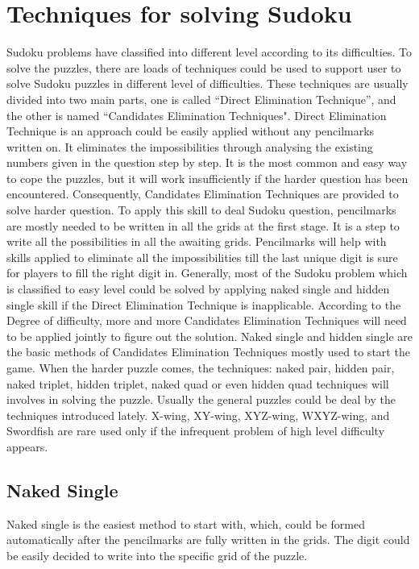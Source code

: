 \documentclass[11pt]{report}
\begin{document}
\chapter{Techniques for solving Sudoku}
\label{sec:Techniques}
Sudoku problems have classified into different level according to its difficulties. To solve the puzzles, there are loads of techniques could be used to support user to solve Sudoku puzzles in different level of difficulties.
These techniques are usually divided into two main parts, one is called “Direct Elimination Technique”, and the other is named “Candidates Elimination Techniques".
Direct Elimination Technique is an approach could be easily applied without any pencilmarks written on. It eliminates the impossibilities through analysing the existing numbers given in the question step by step. It is the most common and easy way to cope the puzzles, but it will work insufficiently if the harder question has been encountered. 
Consequently, Candidates Elimination Techniques are provided to solve harder question. To apply this skill to deal Sudoku question, pencilmarks are mostly needed to be written in all the grids at the first stage. It is a step to write all the possibilities in all the awaiting grids. Pencilmarks will help with skills applied to eliminate all the impossibilities till the last unique digit is sure for players to fill the right digit in.
Generally, most of the Sudoku problem which is classified to easy level could be solved by applying naked single and hidden single skill if the Direct Elimination Technique is inapplicable. According to the Degree of difficulty, more and more Candidates Elimination Techniques will need to be applied jointly to figure out the solution. 
Naked single and hidden single are the basic methods of Candidates Elimination Techniques mostly used to start the game. When the harder puzzle comes, the techniques: naked pair, hidden pair, naked triplet, hidden triplet, naked quad or even hidden quad techniques will involves in solving the puzzle. Usually the general puzzles could be deal by the techniques introduced lately. X-wing, XY-wing, XYZ-wing, WXYZ-wing, and Swordfish are rare used only if the infrequent problem of high level difficulty appears. 

\section{Naked Single}
\label{sec:Naked Single}
Naked single is the easiest method to start with, which, could be formed automatically after the pencilmarks are fully written in the grids. The digit could be easily decided to write into the specific grid of the puzzle.
\end{document}
